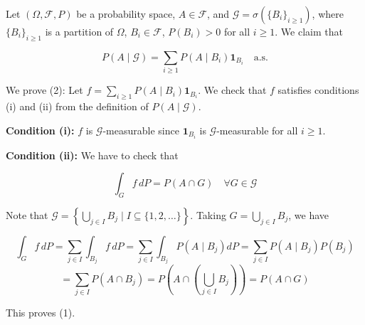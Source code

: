 \begin{example}
Let \((\Omega, \mathcal{F}, P)\) be a probability space, \(A \in \mathcal{F}\), and \(\mathcal{G} = \sigma(\{B_i\}_{i \geq 1})\), where \(\{B_i\}_{i \geq 1}\) is a partition of \(\Omega\), \(B_i \in \mathcal{F}\), \(P(B_i) > 0\) for all \(i \geq 1\). We claim that

\[
P(A \mid \mathcal{G}) = \sum_{i \geq 1} P(A \mid B_i) \mathbf{1}_{B_i} \quad \text{a.s.} \tag{2}
\]

We prove (2): Let \(f = \sum_{i \geq 1} P(A \mid B_i) \mathbf{1}_{B_i}\). We check that \(f\) satisfies conditions (i) and (ii) from the definition of \(P(A \mid \mathcal{G})\).

\textbf{Condition (i):} \(f\) is \(\mathcal{G}\)-measurable since \(\mathbf{1}_{B_i}\) is \(\mathcal{G}\)-measurable for all \(i \geq 1\).

\textbf{Condition (ii):} We have to check that

\[
\int_G f \, dP = P(A \cap G) \quad \forall G \in \mathcal{G} \tag{1}
\]

Note that \(\mathcal{G} = \left\{\bigcup_{j \in I} B_j \mid I \subseteq \{1, 2, \ldots\}\right\}\). Taking \(G = \bigcup_{j \in I} B_j\), we have

\[
\int_G f \, dP = \sum_{j \in I} \int_{B_j} f \, dP = \sum_{j \in I} \int_{B_j} P(A \mid B_j) dP = \sum_{j \in I} P(A \mid B_j) P(B_j)
\]
\[
= \sum_{j \in I} P(A \cap B_j) = P\left(A \cap \left(\bigcup_{j \in I} B_j\right)\right) = P(A \cap G)
\]

This proves (1).
\end{example}


